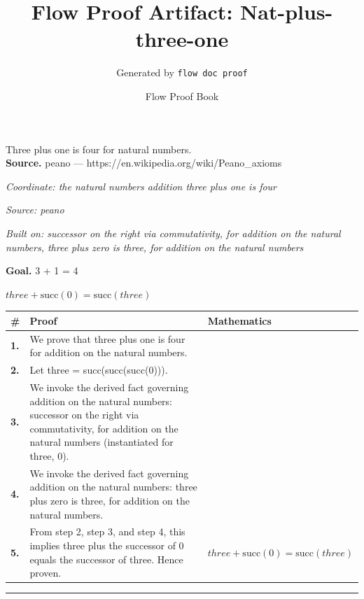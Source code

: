 \documentclass[11pt]{article}
\title{Flow Proof Artifact: Nat-plus-three-one}
\author{Generated by \texttt{flow doc proof}}
\date{Flow Proof Book}
\theoremstyle{definition}
\begin{document}
\maketitle
Three plus one is four for natural numbers.\\[0.5em]
\textbf{Source.} peano — https://en.wikipedia.org/wiki/Peano\_axioms\\[0.5em]
\bigskip
{}\par
\smallskip\noindent\textit{Coordinate: the natural numbers \cdot addition \cdot three plus one is four}\par
\smallskip\noindent\textit{Source: peano}\par
\smallskip\noindent\textit{Built on: successor on the right via commutativity, for addition on the natural numbers, three plus zero is three, for addition on the natural numbers}\par
\medskip
\noindent\textbf{Goal.} 3 + 1 = 4\par
\noindent$\displaystyle three + \mathrm{succ}(0) = \mathrm{succ}(three)$\par
\medskip
\noindent
\begin{tabular}{@{} >{\raggedright\arraybackslash}p{} >{\raggedright\arraybackslash}p{} >{\raggedleft\arraybackslash}p{} @{}}
\textbf{\#} & \textbf{Proof} & \textbf{Mathematics} \\
\midrule
\textbf{1.} & We prove that three plus one is four for addition on the natural numbers. & \\[0.45em]
\textbf{2.} & Let three = succ(succ(succ(0))). & \\[0.45em]
\textbf{3.} & We invoke the derived fact governing addition on the natural numbers: successor on the right via commutativity, for addition on the natural numbers (instantiated for three, 0). & \\[0.45em]
\textbf{4.} & We invoke the derived fact governing addition on the natural numbers: three plus zero is three, for addition on the natural numbers. & \\[0.45em]
\textbf{5.} & From step 2, step 3, and step 4, this implies three plus the successor of 0 equals the successor of three. Hence proven. & $\displaystyle three + \mathrm{succ}(0) = \mathrm{succ}(three)$ \\[0.45em]
\bottomrule
\end{tabular}
\label{thm:Nat-addition-three_plus_one_is_four}
\par\medskip\hrule
\end{document}
